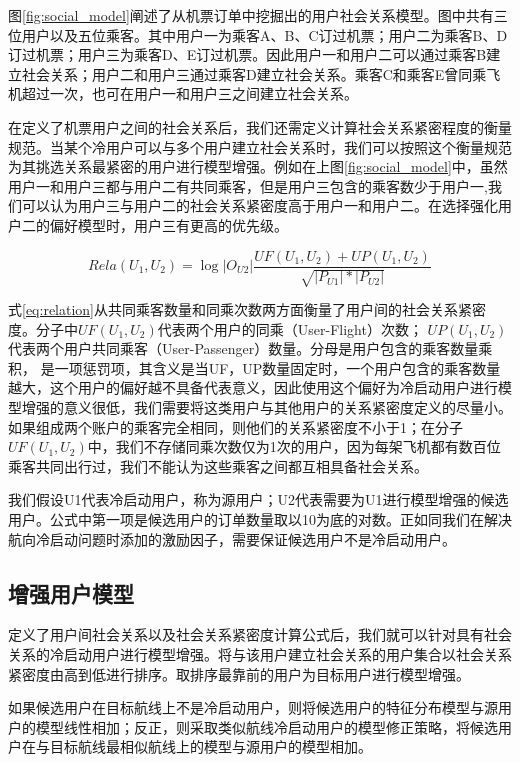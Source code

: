 图\ref{fig:social_model}阐述了从机票订单中挖掘出的用户社会关系模型。图中共有三位用户以及五位乘客。其中用户一为乘客A、B、C订过机票；用户二为乘客B、D订过机票；用户三为乘客D、E订过机票。因此用户一和用户二可以通过乘客B建立社会关系；用户二和用户三通过乘客D建立社会关系。乘客C和乘客E曾同乘飞机超过一次，也可在用户一和用户三之间建立社会关系。

在定义了机票用户之间的社会关系后，我们还需定义计算社会关系紧密程度的衡量规范。当某个冷用户可以与多个用户建立社会关系时，我们可以按照这个衡量规范为其挑选关系最紧密的用户进行模型增强。例如在上图\ref{fig:social_model}中，虽然用户一和用户三都与用户二有共同乘客，但是用户三包含的乘客数少于用户一,我们可以认为用户三与用户二的社会关系紧密度高于用户一和用户二。在选择强化用户二的偏好模型时，用户三有更高的优先级。

\begin{equation}
\label{eq:relation}
	Rela(U_1,U_2) = \log|O_{U2}| \frac{UF(U_1,U_2) + UP(U_1,U_2)}{\sqrt{|P_{U1}|*|P_{U2}|}}
\end{equation}

式\ref{eq:relation}从共同乘客数量和同乘次数两方面衡量了用户间的社会关系紧密度。分子中$UF(U_1,U_2)$代表两个用户的同乘（User-Flight）次数；
$UP(U_1,U_2)$代表两个用户共同乘客（User-Passenger）数量。分母是用户包含的乘客数量乘积，
是一项惩罚项，其含义是当UF，UP数量固定时，一个用户包含的乘客数量越大，这个用户的偏好越不具备代表意义，因此使用这个偏好为冷启动用户进行模型增强的意义很低，我们需要将这类用户与其他用户的关系紧密度定义的尽量小。如果组成两个账户的乘客完全相同，则他们的关系紧密度不小于1；在分子$UF(U_1,U_2)$中，我们不存储同乘次数仅为1次的用户，因为每架飞机都有数百位乘客共同出行过，我们不能认为这些乘客之间都互相具备社会关系。

我们假设U1代表冷启动用户，称为源用户；U2代表需要为U1进行模型增强的候选用户。公式中第一项是候选用户的订单数量取以10为底的对数。正如同我们在解决航向冷启动问题时添加的激励因子，需要保证候选用户不是冷启动用户。

\subsection{增强用户模型}

定义了用户间社会关系以及社会关系紧密度计算公式后，我们就可以针对具有社会关系的冷启动用户进行模型增强。将与该用户建立社会关系的用户集合以社会关系紧密度由高到低进行排序。取排序最靠前的用户为目标用户进行模型增强。

如果候选用户在目标航线上不是冷启动用户，则将候选用户的特征分布模型与源用户的模型线性相加；反正，则采取类似航线冷启动用户的模型修正策略，将候选用户在与目标航线最相似航线上的模型与源用户的模型相加。

